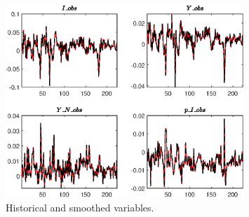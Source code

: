  
\begin{figure}[H]
\centering 
\includegraphics[width=0.80\textwidth]{BRS_gen/graphs/BRS_gen_HistoricalAndSmoothedVariables1}
\caption{Historical and smoothed variables.}\label{Fig:HistoricalAndSmoothedVariables:1}
\end{figure}


